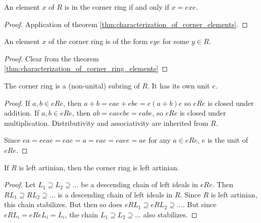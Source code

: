   \begin{theorem}
    \label{thm:characterization_of_corner_ring_elements}
    An element $x$ of $R$ is in the corner ring if and only if $x = e x e$.
  \end{theorem}
  \begin{proof}
    Application of theorem \ref{thm:characterization_of_corner_elements}.
  \end{proof}

  \begin{theorem}
    \label{thm:characterization_of_corner_ring_elements'}
    An element $x$ of the corner ring is of the form $e y e$ for some $y \in R$.
  \end{theorem}
  \begin{proof}
    Clear from the theorem \ref{thm:characterization_of_corner_ring_elements}
  \end{proof}

  \begin{theorem}
    \label{thm:corner_ring_is_ring}
    The corner ring is a (non-unital) subring of $R$. It has its own unit $e$.
  \end{theorem}
  \begin{proof}
    If $a, b \in eRe$, then $a + b = e a e + e b e = e (a + b) e$ so $eRe$ is closed under addition.
    If $a, b \in eRe$, then $a b = e a e e b e  = e a b e$, so $eRe$ is closed under multiplication.
    Distributivity and associativity are inherited from $R$.

    Since $e a = eeae = eae = a = eae = eaee = ae$ for any $a \in eRe$, $e$ is the unit of $eRe$.
  \end{proof}

  \begin{theorem}
    \label{thm:corner_ring_artinian}
    If $R$ is left artinian, then the corner ring is left artinian.
  \end{theorem}
  \begin{proof}
    Let $L_1 \supseteq L_2 \supseteq \ldots$ be a descending chain of left ideals in $eRe$. Then $ RL_1 \supseteq RL_2 \supseteq \ldots$ is a descending chain of left ideals in $R$. Since $R$ is left artinian, this chain stabilizes. But then so does $eRL_1 \supseteq eRL_2 \supseteq \ldots$. But since $eRL_i = eReL_i = L_i$, the chain $L_1 \supseteq L_2 \supseteq \ldots$ also stabilizes.
  \end{proof}

